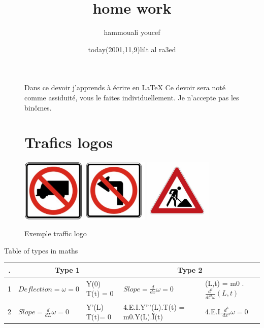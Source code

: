 \documentclass{article}
\date{today(2001,11,9)lilt al ra3ed}
\author{hammouali youcef}
\title{home work}
\begin{document}
\listoffigures
\listoftables
\listofalgorithms
\lstlistoflistings
\newpage
\begin{figure}
\maketitle
Dans ce devoir j'apprends à écrire en \LaTeX
Ce devoir sera noté comme assiduité, vous le faites individuellement. Je n'accepte pas les
binômes.
\section{Trafics logos}

\begin{center}
    

\hspace{0.7cm}
\includegraphics[height=3cm]{traffic.jpg} 
\hspace{0.5cm}
\includegraphics[height=3cm]{traffic1.jpg} 
\hspace{0.5cm}
\includegraphics[height=3cm]{traffic3.jpg} 
\end{center}
\caption{Exemple traffic logo}
\label{figl}
\end{figure}
\clearpage
\begin{table}
\caption{Table of types in maths}
\label{tab1}
\end{table}
\begin{table}
\begin{tabular}{|p{1cm}|p{3cm}|p{1.7cm}|p{4cm}|p{3.5cm}|}

\cline{2-5}  
\multicolumn{1}{c|}{.} & \multicolumn{2}{c|}{Type 1}  &  \multicolumn{2}{c|}{Type 2}  \\
\hline
1 & $Deflection = \omega = 0$  & Y(0)  T(t) = 0 & $ Slope = \frac{d}{dx}\omega = 0$ & (L,t) = m0 . $ \frac{d^{2}}{dt^{2}\omega}(L,t) $ \\
\hline
2 & $ Slope = \frac{d}{dL}\omega = 0$ & Y'(L) T(t)= 0 &  4.E.I.Y'''(L).T(t) = m0.Y(L).Ï(t) & 4.E.I.$ \frac{d^{3}}{dx^{3}}\omega = 0 $ \\
\hline
\end{tabular} 
\end{table}
\end{document}

